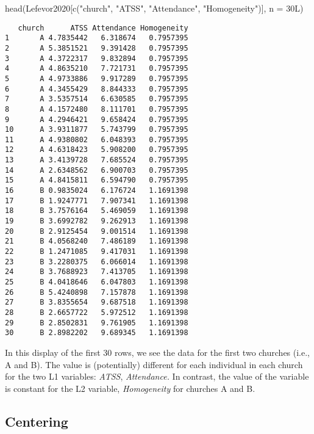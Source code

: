 \documentclass[
  11pt,
]{book}
\newenvironment{Shaded}{\begin{snugshade}}{\end{snugshade}}
\newcommand{\AttributeTok}[1]{\textcolor[rgb]{0.77,0.63,0.00}{#1}}
\newcommand{\FunctionTok}[1]{\textcolor[rgb]{0.00,0.00,0.00}{#1}}
\newcommand{\NormalTok}[1]{#1}
\newcommand{\StringTok}[1]{\textcolor[rgb]{0.31,0.60,0.02}{#1}}
\begin{document}
\begin{Shaded}
\begin{Highlighting}[]
\FunctionTok{head}\NormalTok{(Lefevor2020[}\FunctionTok{c}\NormalTok{(}\StringTok{"church"}\NormalTok{, }\StringTok{"ATSS"}\NormalTok{, }\StringTok{"Attendance"}\NormalTok{, }\StringTok{"Homogeneity"}\NormalTok{)], }\AttributeTok{n =}\NormalTok{ 30L)}
\end{Highlighting}
\end{Shaded}

\begin{verbatim}
   church      ATSS Attendance Homogeneity
1       A 4.7835442   6.318674   0.7957395
2       A 5.3851521   9.391428   0.7957395
3       A 4.3722317   9.832894   0.7957395
4       A 4.8635210   7.721731   0.7957395
5       A 4.9733886   9.917289   0.7957395
6       A 4.3455429   8.844333   0.7957395
7       A 3.5357514   6.630585   0.7957395
8       A 4.1572480   8.111701   0.7957395
9       A 4.2946421   9.658424   0.7957395
10      A 3.9311877   5.743799   0.7957395
11      A 4.9380802   6.048393   0.7957395
12      A 4.6318423   5.908200   0.7957395
13      A 3.4139728   7.685524   0.7957395
14      A 2.6348562   6.900703   0.7957395
15      A 4.8415811   6.594790   0.7957395
16      B 0.9835024   6.176724   1.1691398
17      B 1.9247771   7.907341   1.1691398
18      B 3.7576164   5.469059   1.1691398
19      B 3.6992782   9.262913   1.1691398
20      B 2.9125454   9.001514   1.1691398
21      B 4.0568240   7.486189   1.1691398
22      B 1.2471085   9.417031   1.1691398
23      B 3.2280375   6.066014   1.1691398
24      B 3.7688923   7.413705   1.1691398
25      B 4.0418646   6.047803   1.1691398
26      B 5.4240898   7.157878   1.1691398
27      B 3.8355654   9.687518   1.1691398
28      B 2.6657722   5.972512   1.1691398
29      B 2.8502831   9.761905   1.1691398
30      B 2.8982202   9.689345   1.1691398
\end{verbatim}

In this display of the first 30 rows, we see the data for the first two churches (i.e., A and B). The value is (potentially) different for each individual in each church for the two L1 variables: \emph{ATSS}, \emph{Attendance.} In contrast, the value of the variable is constant for the L2 variable, \emph{Homogeneity} for churches A and B.

\hypertarget{centering}{%
\subsection{Centering}\label{centering}}
\end{document}
